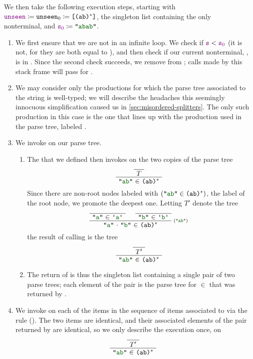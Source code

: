     We then take the following execution steps, starting with $\textcolor{violet}{\texttt{unseen}} \coloneqq \texttt{unseen$_0$} \coloneqq \texttt{[}\texttt{(ab)$^*$}\texttt{]}$, the singleton list containing the only nonterminal, and $\farg{s$_0$} \defeq \str{abab}$.
    \begin{enumerate}
      \item
        We first ensure that we are not in an infinite loop.  We check if $\textcolor{violet}{\texttt{s}} < \textcolor{violet}{\texttt{s$_0$}}$ (it is not, for they are both equal to ), and then check if our current nonterminal, , is in .  Since the second check succeeds, we remove  from ; calls made by this stack frame will pass \nil\space for .
      \item
        We may consider only the productions for which the parse tree associated to the string is well-typed; we will describe the headaches this seemingly innocuous simplification caused us in \autoref{sec:misordered-splitters}.  The only such production in this case is the one that lines up with the production used in the parse tree, labeled .
      \item
        We invoke  on our parse tree.
        \begin{enumerate}
          \item
            The  that we defined then invokes  on the two copies of the parse tree
            \[
              \AxiomC{}
              \UnaryInfC{$T$}
              \UnaryInfC{\str{ab} $\in$ \regex{(ab)$^*$}}
            \DisplayProof
            \]
            Since there are non-root nodes labeled with $(\str{ab}\in\regex{(ab)$^*$})$, the label of the root node, we promote the deepest one.  Letting $T'$ denote the tree
            \[
              \AxiomC{}\UnaryInfC{\str{a} $\in$ \terminal{a}}
              \AxiomC{}\UnaryInfC{\str{b} $\in$ \terminal{b}}
              \RightLabel{\scriptsize(\str{ab})}
              \BinaryInfC{\llstrcat{\str{a}}{\str{b}} $\in$ \regex{(ab)$^*$}}
            \DisplayProof
            \]
            the result of calling  is the tree
            \[
              \AxiomC{}
              \UnaryInfC{$T'$}
              \UnaryInfC{\str{ab} $\in$ \regex{(ab)$^*$}}
            \DisplayProof
            \]

          \item The return of  is thus the singleton list containing a single pair of two parse trees; each element of the pair is the parse tree for  $\in$  that was returned by .
        \end{enumerate}
      \item
        We invoke  on each of the items in the sequence of items associated to  via the rule ().  The two items are identical, and their associated elements of the pair returned by  are identical, so we only describe the execution once, on
        \[
          \AxiomC{}
          \UnaryInfC{$T'$}
          \UnaryInfC{\str{ab} $\in$ \regex{(ab)$^*$}}
        \DisplayProof
        \]


\end{enumerate}

